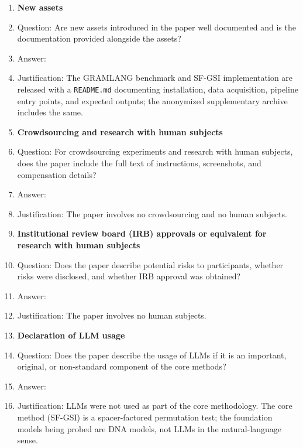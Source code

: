 \begin{enumerate}
\item {\bf New assets}
    \item[] Question: Are new assets introduced in the paper well documented and is the documentation provided alongside the assets?
    \item[] Answer: \answerYes{}
    \item[] Justification: The GRAMLANG benchmark and SF-GSI implementation are released with a \texttt{README.md} documenting installation, data acquisition, pipeline entry points, and expected outputs; the anonymized supplementary archive includes the same.

\item {\bf Crowdsourcing and research with human subjects}
    \item[] Question: For crowdsourcing experiments and research with human subjects, does the paper include the full text of instructions, screenshots, and compensation details?
    \item[] Answer: \answerNA{}
    \item[] Justification: The paper involves no crowdsourcing and no human subjects.

\item {\bf Institutional review board (IRB) approvals or equivalent for research with human subjects}
    \item[] Question: Does the paper describe potential risks to participants, whether risks were disclosed, and whether IRB approval was obtained?
    \item[] Answer: \answerNA{}
    \item[] Justification: The paper involves no human subjects.

\item {\bf Declaration of LLM usage}
    \item[] Question: Does the paper describe the usage of LLMs if it is an important, original, or non-standard component of the core methods?
    \item[] Answer: \answerNA{}
    \item[] Justification: LLMs were not used as part of the core methodology. The core method (SF-GSI) is a spacer-factored permutation test; the foundation models being probed are DNA models, not LLMs in the natural-language sense.

\end{enumerate}

